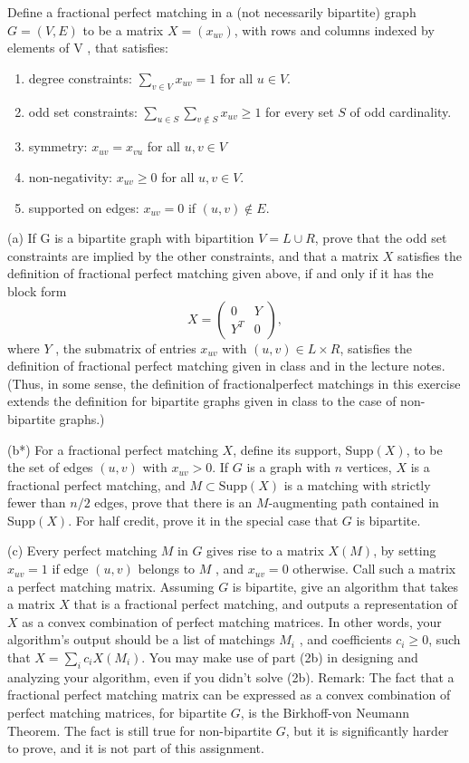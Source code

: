 \documentclass{hmcpset}
\begin{document}
\begin{problem}[2]
Define a fractional perfect matching in a (not necessarily bipartite) graph $G = (V, E)$ to be a matrix
$X = \left (x_{uv} \right)$, with rows and columns indexed by elements of V , that satisfies:
\begin{enumerate}
\item degree constraints: $\sum_{v\in V}x_{uv} = 1$ for all $u \in V$.
\item odd set constraints: $\sum_{u\in S} \sum_{v \not \in S} x_{uv} \geq 1$ for every set $S$ of odd cardinality.
\item symmetry: $x_{uv} = x_{vu}$ for all $u, v\in V$
\item non-negativity: $x_{uv} \geq 0$ for all $u, v \in V$.
\item supported on edges: $x_{uv} = 0$ if $(u, v) \not \in E$.
\end{enumerate}

(a) If G is a bipartite graph with bipartition $V = L \cup R$, prove that the odd set constraints
are implied by the other constraints, and that a matrix $X$ satisfies the definition of fractional perfect
matching given above, if and only if it has the block form
\[ X = \begin{pmatrix}0 & Y \\ Y^T & 0 \end{pmatrix},\]
where $Y$ , the submatrix of entries $x_{uv}$ with $(u, v) \in L \times R$, satisfies the definition of fractional perfect
matching given in class and in the lecture notes. (Thus, in some sense, the definition of fractionalperfect matchings in this exercise extends the definition for bipartite graphs given in class to the case
of non-bipartite graphs.)

(b*) For a fractional perfect matching $X$, define its support, Supp$(X)$, to be the set of edges $(u, v)$
with $x_{uv} > 0$. If $G$ is a graph with $n$ vertices, $X$ is a fractional perfect matching, and $M \subset \text{Supp}(X)$ is
a matching with strictly fewer than $n/2$ edges, prove that there is an $M$-augmenting path contained in
Supp$(X)$. For half credit, prove it in the special case that $G$ is bipartite.

(c) Every perfect matching $M$ in $G$ gives rise to a matrix $X(M)$, by setting $x_{uv} = 1$ if edge $(u, v)$
belongs to $M$ , and $x_{uv} = 0$ otherwise. Call such a matrix a perfect matching matrix. Assuming $G$ is
bipartite, give an algorithm that takes a matrix $X$ that is a fractional perfect matching, and outputs
a representation of $X$ as a convex combination of perfect matching matrices. In other words, your
algorithm’s output should be a list of matchings $M_i$ , and coefficients $c_i \geq 0$, such that $X = \sum_i c_i X(M_i)$.
You may make use of part (2b) in designing and analyzing your algorithm, even if you didn’t solve (2b).
Remark: The fact that a fractional perfect matching matrix can be expressed as a convex combination
of perfect matching matrices, for bipartite $G$, is the Birkhoff-von Neumann Theorem. The fact is still
true for non-bipartite $G$, but it is significantly harder to prove, and it is not part of this assignment.
\end{problem}
\end{document}
